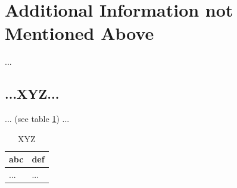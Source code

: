 \section{Additional Information not Mentioned Above}\label{sec:last}
%
...
%
%
%
\subsection{...XYZ...}\label{sec:last-xyz}
%
... (see table \ref{tbl:last-xyz}) ...

\begin{table}[H]
    \begin{tabularx}{\textwidth}{l|l}
        \textbf{abc} & \textbf{def} \\
        \hline
        ... & ...\\
    \end{tabularx}
    \caption{XYZ\label{tbl:last-xyz}}
\end{table}
%
%
%
